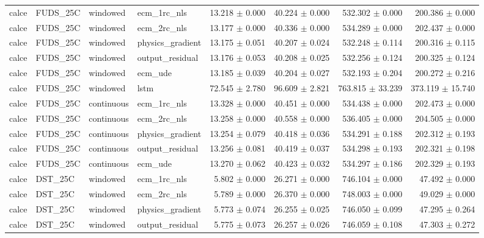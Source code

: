 \begin{longtable}{llllrrrr}
calce & FUDS\_25C & windowed & ecm\_1rc\_nls & 13.218 $\pm$ 0.000 & 40.224 $\pm$ 0.000 & 532.302 $\pm$ 0.000 & 200.386 $\pm$ 0.000 \\
calce & FUDS\_25C & windowed & ecm\_2rc\_nls & 13.177 $\pm$ 0.000 & 40.336 $\pm$ 0.000 & 534.289 $\pm$ 0.000 & 202.437 $\pm$ 0.000 \\
calce & FUDS\_25C & windowed & physics\_gradient & 13.175 $\pm$ 0.051 & 40.207 $\pm$ 0.024 & 532.248 $\pm$ 0.114 & 200.316 $\pm$ 0.115 \\
calce & FUDS\_25C & windowed & output\_residual & 13.176 $\pm$ 0.053 & 40.208 $\pm$ 0.025 & 532.256 $\pm$ 0.124 & 200.325 $\pm$ 0.124 \\
calce & FUDS\_25C & windowed & ecm\_ude & 13.185 $\pm$ 0.039 & 40.204 $\pm$ 0.027 & 532.193 $\pm$ 0.204 & 200.272 $\pm$ 0.216 \\
calce & FUDS\_25C & windowed & lstm & 72.545 $\pm$ 2.780 & 96.609 $\pm$ 2.821 & 763.815 $\pm$ 33.239 & 373.119 $\pm$ 15.740 \\
calce & FUDS\_25C & continuous & ecm\_1rc\_nls & 13.328 $\pm$ 0.000 & 40.451 $\pm$ 0.000 & 534.438 $\pm$ 0.000 & 202.473 $\pm$ 0.000 \\
calce & FUDS\_25C & continuous & ecm\_2rc\_nls & 13.258 $\pm$ 0.000 & 40.558 $\pm$ 0.000 & 536.405 $\pm$ 0.000 & 204.505 $\pm$ 0.000 \\
calce & FUDS\_25C & continuous & physics\_gradient & 13.254 $\pm$ 0.079 & 40.418 $\pm$ 0.036 & 534.291 $\pm$ 0.188 & 202.312 $\pm$ 0.193 \\
calce & FUDS\_25C & continuous & output\_residual & 13.256 $\pm$ 0.081 & 40.419 $\pm$ 0.037 & 534.298 $\pm$ 0.193 & 202.321 $\pm$ 0.198 \\
calce & FUDS\_25C & continuous & ecm\_ude & 13.270 $\pm$ 0.062 & 40.423 $\pm$ 0.032 & 534.297 $\pm$ 0.186 & 202.329 $\pm$ 0.193 \\
calce & DST\_25C & windowed & ecm\_1rc\_nls & 5.802 $\pm$ 0.000 & 26.271 $\pm$ 0.000 & 746.104 $\pm$ 0.000 & 47.492 $\pm$ 0.000 \\
calce & DST\_25C & windowed & ecm\_2rc\_nls & 5.789 $\pm$ 0.000 & 26.370 $\pm$ 0.000 & 748.003 $\pm$ 0.000 & 49.029 $\pm$ 0.000 \\
calce & DST\_25C & windowed & physics\_gradient & 5.773 $\pm$ 0.074 & 26.255 $\pm$ 0.025 & 746.050 $\pm$ 0.099 & 47.295 $\pm$ 0.264 \\
calce & DST\_25C & windowed & output\_residual & 5.775 $\pm$ 0.073 & 26.257 $\pm$ 0.026 & 746.059 $\pm$ 0.108 & 47.303 $\pm$ 0.272 \\

\end{longtable}
